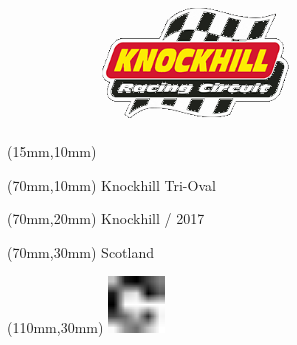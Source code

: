 \null\newpage
\begin{textblock*}{50mm}(15mm,10mm)%
\includegraphics[width=50mm]{LG/KNO.png}
\end{textblock*}
\begin{textblock*}{130mm}(70mm,10mm)%
{\fontsize{20}{20}\selectfont Knockhill Tri-Oval}\\
\end{textblock*}
\begin{textblock*}{120mm}(70mm,20mm)%
{\fontsize{16}{16}\selectfont Knockhill / 2017}\\
\end{textblock*}
\begin{textblock*}{120mm}(70mm,30mm)%
{\fontsize{12}{12}\selectfont Scotland}
\end{textblock*}
\begin{textblock*}{30mm}(110mm,30mm)%
\centering
\includegraphics[height=15mm]{icons/fa-rotate-right.pdf}
\end{textblock*}
